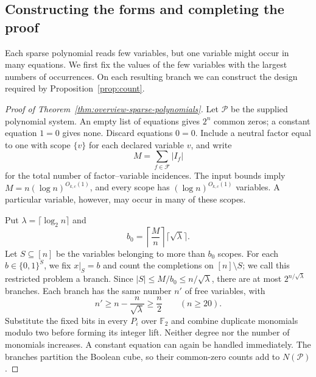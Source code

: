 \documentclass[11pt,reqno]{amsart}
\numberwithin{equation}{section}
\theoremstyle{definition}\newtheorem{definition}[theorem]{Definition}
\theoremstyle{remark}\newtheorem{remark}[theorem]{Remark}
\renewcommand{\le}{\leqslant}
\renewcommand{\ge}{\geqslant}
\begin{document}
\subsection{Constructing the forms and completing the proof}\label{subsec:sparse-queries}
Each sparse polynomial reads few variables, but one variable might
occur in many equations. We first fix the values of the few variables
with the largest numbers of occurrences. On each resulting branch we
can construct the design required by Proposition~\ref{prop:count}.

\begin{proof}[Proof of Theorem~\ref{thm:overview-sparse-polynomials}]
Let $\mathcal P$ be the supplied polynomial system. An empty list of
equations gives $2^n$ common zeros; a constant equation $1=0$ gives
none. Discard equations $0=0$. Include a neutral factor equal to one
with scope $\{v\}$ for each declared variable $v$, and write
\[
 M=\sum_{f\in\mathcal F}|I_f|
\]
for the total number of factor--variable incidences. The input
bounds imply $M=n(\log n)^{O_{k,c}(1)}$, and every scope has
$(\log n)^{O_{k,c}(1)}$ variables. A particular variable, however,
may occur in many of these scopes.

Put $\lambda=\lceil\log_2 n\rceil$ and
\[
 b_0=\left\lceil\frac Mn\right\rceil\lceil\sqrt\lambda\rceil.
\]
Let $S\subseteq[n]$ be the variables belonging to more than $b_0$
scopes. For each $b\in\{0,1\}^S$, we fix $x|_S=b$ and count the
completions on $[n]\setminus S$; we call this restricted problem a
branch. Since $|S|\le M/b_0\le n/\sqrt\lambda$, there are at most
$2^{n/\sqrt\lambda}$ branches.
Each branch has the same number $n'$ of free variables, with
\[
 n'\ge n-\frac n{\sqrt\lambda}\ge\frac n2
 \qquad(n\ge20).
\]
Substitute the fixed bits in every $P_i$ over $\mathbb F_2$ and
combine duplicate monomials modulo two before forming its integer
lift. Neither degree nor the number of monomials increases. A constant
equation can again be handled immediately. The branches partition the
Boolean cube, so their common-zero counts add to $N(\mathcal P)$.


\end{proof}
\end{document}
